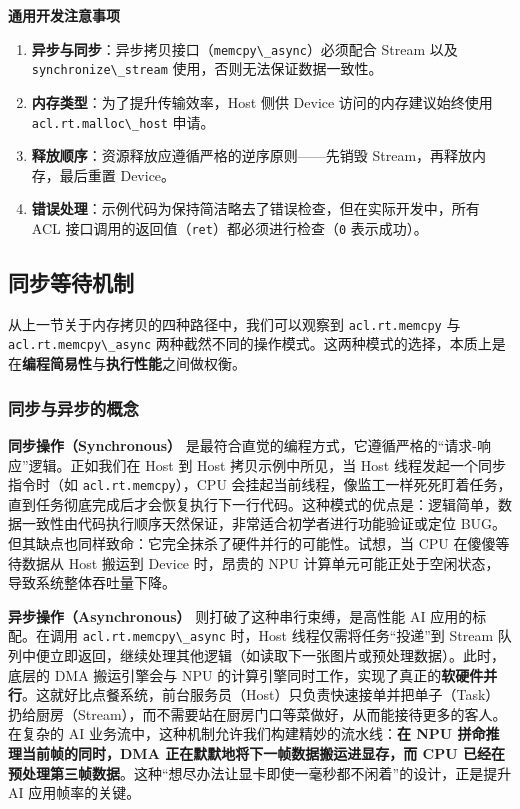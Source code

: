 \textbf{通用开发注意事项}

\begin{enumerate}
\def\labelenumi{\arabic{enumi}.}
\tightlist
\item
  \textbf{异步与同步}：异步拷贝接口（\passthrough{\lstinline!memcpy\_async!}）必须配合
  Stream 以及 \passthrough{\lstinline!synchronize\_stream!}
  使用，否则无法保证数据一致性。
\item
  \textbf{内存类型}：为了提升传输效率，Host 侧供 Device
  访问的内存建议始终使用 \passthrough{\lstinline!acl.rt.malloc\_host!}
  申请。
\item
  \textbf{释放顺序}：资源释放应遵循严格的逆序原则------先销毁
  Stream，再释放内存，最后重置 Device。
\item
  \textbf{错误处理}：示例代码为保持简洁略去了错误检查，但在实际开发中，所有
  ACL
  接口调用的返回值（\passthrough{\lstinline!ret!}）都必须进行检查（\passthrough{\lstinline!0!}
  表示成功）。
\end{enumerate}

\subsection{同步等待机制}\label{src-book-chapter4-h11}

从上一节关于内存拷贝的四种路径中，我们可以观察到
\passthrough{\lstinline!acl.rt.memcpy!} 与
\passthrough{\lstinline!acl.rt.memcpy\_async!}
两种截然不同的操作模式。这两种模式的选择，本质上是在\textbf{编程简易性}与\textbf{执行性能}之间做权衡。

\subsubsection{同步与异步的概念}\label{src-book-chapter4-h12}

\textbf{同步操作（Synchronous）}
是最符合直觉的编程方式，它遵循严格的``请求-响应''逻辑。正如我们在 Host
到 Host 拷贝示例中所见，当 Host 线程发起一个同步指令时（如
\passthrough{\lstinline!acl.rt.memcpy!}），CPU
会挂起当前线程，像监工一样死死盯着任务，直到任务彻底完成后才会恢复执行下一行代码。这种模式的优点是：逻辑简单，数据一致性由代码执行顺序天然保证，非常适合初学者进行功能验证或定位
BUG。但其缺点也同样致命：它完全抹杀了硬件并行的可能性。试想，当 CPU
在傻傻等待数据从 Host 搬运到 Device 时，昂贵的 NPU
计算单元可能正处于空闲状态，导致系统整体吞吐量下降。

\textbf{异步操作（Asynchronous）} 则打破了这种串行束缚，是高性能 AI
应用的标配。在调用 \passthrough{\lstinline!acl.rt.memcpy\_async!}
时，Host 线程仅需将任务``投递''到 Stream
队列中便立即返回，继续处理其他逻辑（如读取下一张图片或预处理数据）。此时，底层的
DMA 搬运引擎会与 NPU
的计算引擎同时工作，实现了真正的\textbf{软硬件并行}。这就好比点餐系统，前台服务员（Host）只负责快速接单并把单子（Task）扔给厨房（Stream），而不需要站在厨房门口等菜做好，从而能接待更多的客人。在复杂的
AI 业务流中，这种机制允许我们构建精妙的流水线：\textbf{在 NPU
拼命推理当前帧的同时，DMA 正在默默地将下一帧数据搬运进显存，而 CPU
已经在预处理第三帧数据}。这种``想尽办法让显卡即使一毫秒都不闲着''的设计，正是提升
AI 应用帧率的关键。

